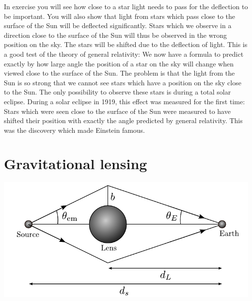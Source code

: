 {\begin{multicols}{2}
In exercise   you will see how close to a star light needs to pass for the deflection to be important. You will also show that light from stars which pass close to the surface of the Sun will be deflected significantly. Stars which we observe in a direction close to the surface of the Sun will thus be observed in the wrong position on the sky. The stars will be shifted due to the deflection of light. This is a good test of the theory of general relativity: We now have a formula to predict exactly by how large angle the position of a star on the sky will change when viewed close to the surface of the Sun. The problem is that the light from the Sun is so strong that we cannot see stars which have a position on the sky close to the Sun. The only possibility to observe these stars is during a total solar eclipse. During a solar eclipse in 1919, this effect was measured for the first time: Stars which were seen close to the surface of the Sun were measured to have shifted their position with exactly the angle predicted by general relativity. This was the discovery which made Einstein famous.

\section{Gravitational lensing}
\label{sect:lensing}

\begin{Figure}
\centering
\includegraphics[width=\textwidth]{fig_18-6.pdf}
\end{Figure}



\end{multicols}}

